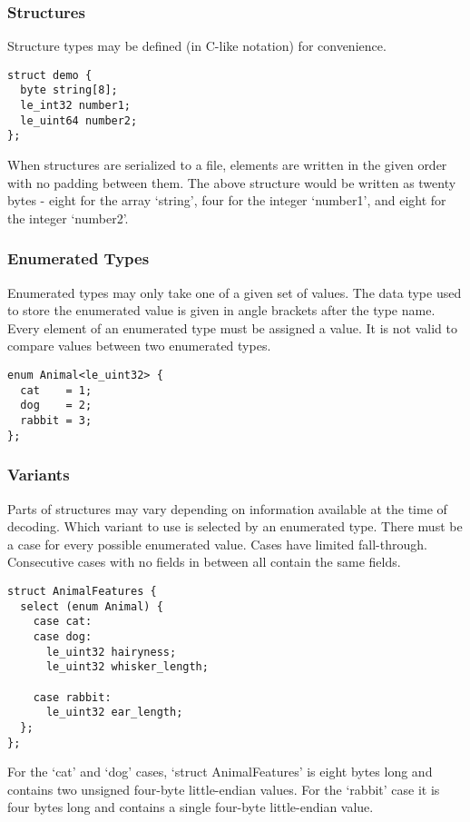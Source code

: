 \documentclass[10pt]{article}
\begin{document}
\subsubsection{Structures}
Structure types may be defined (in C-like notation) for convenience.

\begin{verbatim}
struct demo {
  byte string[8];
  le_int32 number1;
  le_uint64 number2;
};
\end{verbatim}

When structures are serialized to a file, elements are written in the given order with no padding between them.
The above structure would be written as twenty bytes - eight for the array `string', four for the integer `number1',
and eight for the integer `number2'.

\subsubsection{Enumerated Types}
Enumerated types may only take one of a given set of values.
The data type used to store the enumerated value is given in angle brackets after the type name.
Every element of an enumerated type must be assigned a value.
It is not valid to compare values between two enumerated types.

\begin{verbatim}
enum Animal<le_uint32> {
  cat    = 1;
  dog    = 2;
  rabbit = 3;
};
\end{verbatim}

\subsubsection{Variants}
Parts of structures may vary depending on information available at the time of decoding.
Which variant to use is selected by an enumerated type.
There must be a case for every possible enumerated value.
Cases have limited fall-through.
Consecutive cases with no fields in between all contain the same fields.

\begin{verbatim}
struct AnimalFeatures {
  select (enum Animal) {
    case cat:
    case dog:
      le_uint32 hairyness;
      le_uint32 whisker_length;

    case rabbit:
      le_uint32 ear_length;
  };
};
\end{verbatim}

For the `cat' and `dog' cases, `struct AnimalFeatures' is eight bytes long and contains two unsigned four-byte
little-endian values.
For the `rabbit' case it is four bytes long and contains a single four-byte little-endian value.
\end{document}
